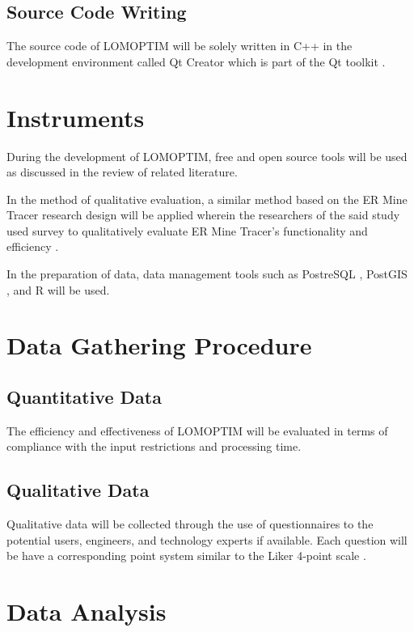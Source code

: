 \documentclass[12pt]{report}
\begin{document}
\subsection{Source Code Writing}

The source code of LOMOPTIM will be solely written in C++ \cite{cpp} in the development environment called Qt Creator which is part of the Qt toolkit \cite{qt}.

\section{Instruments}

During the development of LOMOPTIM, free and open source tools will be used as discussed in the review of related literature.

In the method of qualitative evaluation, a similar method based on the ER Mine Tracer research design will be applied wherein the researchers of the said study used survey to qualitatively evaluate ER Mine Tracer's functionality and efficiency \cite{ERMineTracer}.

In the preparation of data, data management tools such as PostreSQL \cite{postgres}, PostGIS \cite{postgis}, and R \cite{R} will be used.

\section{Data Gathering Procedure}

\subsection{Quantitative Data}

The efficiency and effectiveness of LOMOPTIM will be evaluated in terms of compliance with the input restrictions and processing time.

\subsection{Qualitative Data}

Qualitative data will be collected through the use of questionnaires to the potential users, engineers, and technology experts if available.
Each question will be have a corresponding point system similar to the Liker 4-point scale \cite{Likert}.

\section{Data Analysis}
\end{document}
